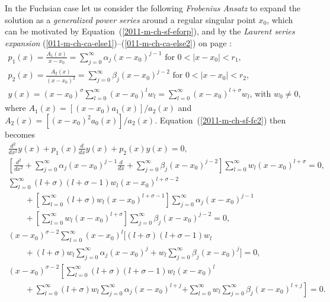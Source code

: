 In the Fuchsian case let us consider the following {\it Frobenius Ansatz}
to expand the solution as a {\em generalized power series} around a regular singular point $x_0$,
which can be  motivated by Equation~(\ref{2011-m-ch-sf-eforp}), and by the {\em Laurent series expansion}
(\ref{011-m-ch-ca-else1})--(\ref{011-m-ch-ca-else2}) on
page \pageref{011-m-ch-ca-else1}:
\begin{equation}
\begin{split}
  p_1  (x)  = \frac{A_1(x)}{x-x_0}=\sum_{j=0}^\infty \alpha_j (x-x_0)^{j-1} \textrm{  for } 0 < \vert x-x_0 \vert < r_1,\\
 p_2 (x) = \frac{A_2(x)}{(x-x_0)^2}=\sum_{j=0}^\infty \beta_j (x-x_0)^{j-2} \textrm{  for } 0 < \vert x-x_0 \vert < r_2,\\
y(x)=  (x-x_0)^{\sigma} \sum_{l=0}^\infty  (x-x_0)^{l} w_l
=  \sum_{l=0}^\infty (x-x_0)^{l + \sigma} w_l \textrm{, with } w_0\neq 0
,
\end{split}
\label{2011-m-ch-sf-pss2}
\end{equation}
where $A_1(x)= [(x-x_0) a_1(x)]/a_2(x)$
and $A_2(x)= [(x-x_0)^2 a_0(x)]/a_2(x)$.
Equation~(\ref{2011-m-ch-sf-fc2})
then becomes
\begin{equation*}
\begin{split}
\frac{d^2}{dx^2}y(x) +   p_1  (x)    \frac{d}{dx}y(x)+    p_2  (x)   y(x)     =   0,    \\
\left[\frac{d^2}{dx^2}  + \sum_{j=0}^\infty \alpha_j (x-x_0)^{j-1}  \frac{d}{dx} + \sum_{j=0}^\infty \beta_j (x-x_0)^{j-2}\right]
\sum_{l=0}^\infty w_l (x-x_0)^{l + \sigma}     =   0,    \\
\sum_{l=0}^\infty ({l + \sigma})({l + \sigma-1}) w_l (x-x_0)^{l + \sigma -2}\qquad \qquad \\
\qquad + \left[  \sum_{l=0}^\infty ({l + \sigma}) w_l (x-x_0)^{l + \sigma -1}\right]  \sum_{j=0}^\infty \alpha_j (x-x_0)^{j-1} \qquad \qquad
\\
\qquad + \left[\sum_{l=0}^\infty w_l (x-x_0)^{l + \sigma}\right] \sum_{j=0}^\infty \beta_j (x-x_0)^{j-2}
    =   0,    \\
(x-x_0)^{\sigma-2}  \sum_{l=0}^\infty (x-x_0)^{l}
\Bigg[
({l + \sigma})({l + \sigma-1})   w_l  \qquad \qquad \\
\qquad + ({l + \sigma})   w_l    \sum_{j=0}^\infty \alpha_j (x-x_0)^{j}
+  w_l  \sum_{j=0}^\infty \beta_j (x-x_0)^{j}
\Bigg]
    =   0,
\\
(x-x_0)^{\sigma-2} \left[ \sum_{l=0}^\infty
({l + \sigma})({l + \sigma-1})   w_l (x-x_0)^{l}\right. \qquad \qquad \\
\qquad +  \sum_{l=0}^\infty ({l + \sigma})   w_l    \sum_{j=0}^\infty \alpha_j (x-x_0)^{l+j}
\left.
 +  \sum_{l=0}^\infty  w_l  \sum_{j=0}^\infty \beta_j (x-x_0)^{l+j}  \right]
    =   0.
\end{split}
\end{equation*}
